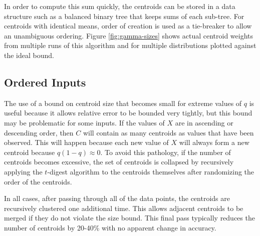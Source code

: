 \documentclass[11pt]{amsart}
\begin{document}
In order to compute this sum quickly, the centroids can be stored in a data structure such as a balanced binary tree that keeps sums of each sub-tree.  For centroids with identical means, order of creation is used as a tie-breaker to allow an unambiguous ordering.  Figure \ref{fig:gamma-sizes} shows actual centroid weights from multiple runs of this algorithm and for multiple distributions plotted against the ideal bound.

\subsection{Ordered Inputs}
The use of a bound on centroid size that becomes small for extreme values of $q$ is useful because it allows relative error to be bounded very tightly, but this bound may be problematic for some inputs.  If the values of $X$ are in ascending or descending order, then $C$ will contain as many centroids as values that have been observed.  This will happen because each new value of $X$ will always form a new centroid because $q(1-q)\approx0$.  To avoid this pathology, if the number of centroids becomes excessive, the set of centroids is collapsed by recursively applying the $t$-digest algorithm to the centroids themselves after randomizing the order of the centroids.  

In all cases, after passing through all of the data points, the centroids are recursively clustered one additional time.  This allows adjacent centroids to be merged if they do not violate the size bound.  This final pass typically reduces the number of centroids by 20-40\% with no apparent change in accuracy.
\end{document}
